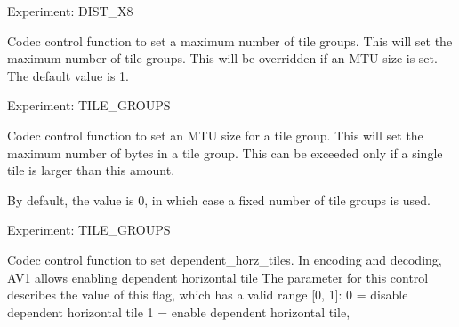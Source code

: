 \begin{Desc}
\begin{description}
Experiment\+: D\+I\+S\+T\+\_\+X8 \item[{\em 
A\+V1\+E\+\_\+\+S\+E\+T\+\_\+\+N\+U\+M\+\_\+\+TG\hypertarget{group__aom__encoder_ggae78dde67a6d78f332e9bdba0dde42db5a9ac0044ad63e6848a482db04f0858c44}{}\label{group__aom__encoder_ggae78dde67a6d78f332e9bdba0dde42db5a9ac0044ad63e6848a482db04f0858c44}
}]Codec control function to set a maximum number of tile groups. This will set the maximum number of tile groups. This will be overridden if an M\+TU size is set. The default value is 1.

Experiment\+: T\+I\+L\+E\+\_\+\+G\+R\+O\+U\+PS \item[{\em 
A\+V1\+E\+\_\+\+S\+E\+T\+\_\+\+M\+TU\hypertarget{group__aom__encoder_ggae78dde67a6d78f332e9bdba0dde42db5a353037d84b6c47ac0138fa843b70a2bb}{}\label{group__aom__encoder_ggae78dde67a6d78f332e9bdba0dde42db5a353037d84b6c47ac0138fa843b70a2bb}
}]Codec control function to set an M\+TU size for a tile group. This will set the maximum number of bytes in a tile group. This can be exceeded only if a single tile is larger than this amount.

By default, the value is 0, in which case a fixed number of tile groups is used.

Experiment\+: T\+I\+L\+E\+\_\+\+G\+R\+O\+U\+PS \item[{\em 
A\+V1\+E\+\_\+\+S\+E\+T\+\_\+\+T\+I\+L\+E\+\_\+\+D\+E\+P\+E\+N\+D\+E\+N\+T\+\_\+\+R\+O\+WS\hypertarget{group__aom__encoder_ggae78dde67a6d78f332e9bdba0dde42db5a8a30f7c44581c6164b48fc9d4d5c1730}{}\label{group__aom__encoder_ggae78dde67a6d78f332e9bdba0dde42db5a8a30f7c44581c6164b48fc9d4d5c1730}
}]Codec control function to set dependent\+\_\+horz\+\_\+tiles. In encoding and decoding, A\+V1 allows enabling dependent horizontal tile The parameter for this control describes the value of this flag, which has a valid range \mbox{[}0, 1\mbox{]}\+: 0 = disable dependent horizontal tile 1 = enable dependent horizontal tile,


\end{description}
\end{Desc}
